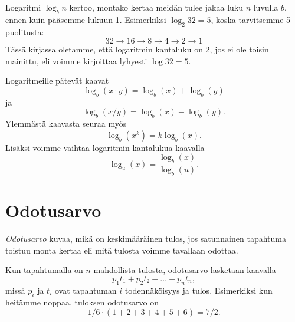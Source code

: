 Logaritmi $\log_b n$ kertoo,
montako kertaa meidän tulee jakaa luku $n$ luvulla $b$,
ennen kuin pääsemme lukuun 1.
Esimerkiksi $\log_2 32 =5$, koska tarvitsemme 5 puolitusta:
\[32 \rightarrow 16 \rightarrow 8 \rightarrow 4 \rightarrow 2 \rightarrow 1\]
Tässä kirjassa oletamme, että logaritmin kantaluku on 2,
jos ei ole toisin mainittu,
eli voimme kirjoittaa lyhyesti $\log 32 = 5$.

Logaritmeille pätevät kaavat
\[\log_b(x \cdot y) = \log_b(x)+\log_b(y)\]
ja
\[\log_b(x / y) = \log_b(x)-\log_b(y).\]
Ylemmästä kaavasta seuraa myös
\[\log_b(x^k) = k \log_b(x).\]
Lisäksi voimme vaihtaa logaritmin kantalukua kaavalla
\[\log_u(x) = \frac{\log_b(x)}{\log_b(u)}.\]

\section*{Odotusarvo}


\emph{Odotusarvo} kuvaa, mikä on keskimääräinen tulos,
jos satunnainen tapahtuma toistuu monta kertaa eli mitä
tulosta voimme tavallaan odottaa.

Kun tapahtumalla on $n$ mahdollista tulosta,
odotusarvo lasketaan kaavalla
\[p_1 t_1 + p_2 t_2 + \dots + p_n t_n,\]
missä $p_i$ ja $t_i$ ovat tapahtuman $i$ todennäköisyys ja tulos.
Esimerkiksi kun heitämme noppaa, tuloksen odotusarvo on
\[1/6 \cdot (1+2+3+4+5+6) = 7/2.\]
